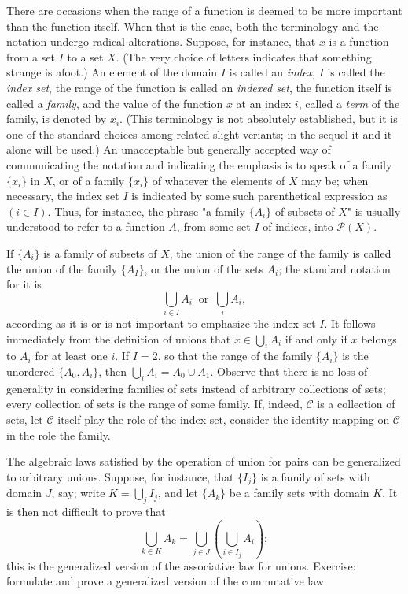 There are occasions when the range of a function is deemed to be more important than the function itself. When that is the case, both the terminology and the notation undergo radical alterations. Suppose, for instance, that $x$ is a function from a set $I$ to a set $X$. (The very choice of letters indicates that something strange is afoot.) An element of the domain $I$ is called an \textit{index}, $I$ is called the \textit{index set}, the range of the function is called an \textit{indexed set}, the function itself is called a \textit{family}, and the value of the function $x$ at an index $i$, called a \textit{term} of the family, is denoted by $x_{i}$. (This terminology is not absolutely established, but it is one of the standard choices among related slight veriants; in the sequel it and it alone will be used.) An unacceptable but generally accepted way of communicating the notation and indicating the emphasis is to speak of a family $\{ x_{i}  \}$ in $X$, or of a family $\{ x_{i} \}$ of whatever the elements of $X$ may be; when necessary, the index set $I$ is indicated by some such parenthetical expression as $(i \in I)$. Thus, for instance, the phrase "a family $\{ A_{i} \}$ of subsets of $X$" is usually understood to refer to a function $A$, from some set $I$ of indices, into $\mathcal{P}(X)$. 

If $ \{ A_{i} \}$ is a family of subsets of $X$, the union of the range of the family is called the union of the family $\{ A_{I} \}$, or the union of the sets $A_{i}$; the standard notation for it is
\begin{equation*}
\bigcup_{i \in I}A_{i} \: \text{ or } \: \bigcup_{i}A_{i},
\end{equation*}
according as it is or is not important to emphasize the index set $I$. It follows immediately from the definition of unions that $x \in \bigcup_{i} A_{i}$ if and only if $x$ belongs to $A_{i}$ for at least one $i$. If $I = 2$, so that the range of the family $\{ A_{i} \}$ is the unordered $\{ A_{0}, A_{i} \} $, then $\bigcup_{i}A_{i} =  A_{0} \cup A_{1}$. Observe that there is no loss of generality in considering families of sets instead of arbitrary collections of sets; every collection of sets is the range of some family. If, indeed, $\mathcal{C}$ is a collection of sets, let $\mathcal{C}$ itself play the role of the index set, consider the identity mapping on $\mathcal{C}$ in the role the family. 

The algebraic laws satisfied by the operation of union for pairs can be generalized to arbitrary unions. Suppose, for instance, that $ \{ I_{j} \}$ is a family of sets with domain $J$, say; write $K = \bigcup_{j}I_{j}$, and let $\{ A_{k} \}$ be a family sets with domain $K$. It is then not difficult to prove that 
\begin{equation*}
\bigcup_{k \in K}A_{k} = \bigcup_{j \in J}(\bigcup_{i \in I_{j}}A_{i});
\end{equation*}
this is the generalized version of the associative law for unions. Exercise: formulate and prove a generalized version of the commutative law. 

